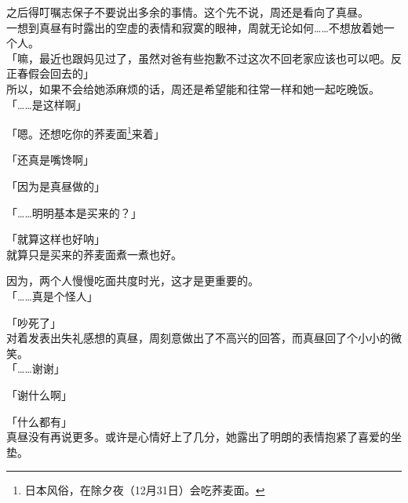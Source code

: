 之后得叮嘱志保子不要说出多余的事情。这个先不说，周还是看向了真昼。\\

一想到真昼有时露出的空虚的表情和寂寞的眼神，周就无论如何……不想放着她一个人。\\

「嘛，最近也跟妈见过了，虽然对爸有些抱歉不过这次不回老家应该也可以吧。反正春假会回去的」\\

所以，如果不会给她添麻烦的话，周还是希望能和往常一样和她一起吃晚饭。\\

「……是这样啊」

「嗯。还想吃你的荞麦面\footnote{日本风俗，在除夕夜（12月31日）会吃荞麦面。}来着」

「还真是嘴馋啊」

「因为是真昼做的」

「……明明基本是买来的？」

「就算这样也好呐」\\

就算只是买来的荞麦面煮一煮也好。

因为，两个人慢慢吃面共度时光，这才是更重要的。\\

「……真是个怪人」

「吵死了」\\

对着发表出失礼感想的真昼，周刻意做出了不高兴的回答，而真昼回了个小小的微笑。\\

「……谢谢」

「谢什么啊」

「什么都有」\\

真昼没有再说更多。或许是心情好上了几分，她露出了明朗的表情抱紧了喜爱的坐垫。
